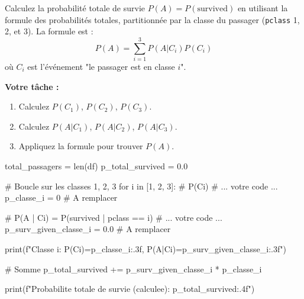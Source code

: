 \begin{exercicebox}
Calculez la probabilité totale de survie $P(A) = P(\text{survived})$ en utilisant la formule des probabilités totales, partitionnée par la classe du passager (\texttt{pclass} 1, 2, et 3).
La formule est :
$$P(A) = \sum_{i=1}^{3} P(A | C_i) P(C_i)$$
où $C_i$ est l'événement "le passager est en classe $i$".

\textbf{Votre tâche :}
\begin{enumerate}
    \item Calculez $P(C_1)$, $P(C_2)$, $P(C_3)$.
    \item Calculez $P(A | C_1)$, $P(A | C_2)$, $P(A | C_3)$.
    \item Appliquez la formule pour trouver $P(A)$.
\end{enumerate}

\begin{codecell}
total_passagers = len(df)
p_total_survived = 0.0

# Boucle sur les classes 1, 2, 3
for i in [1, 2, 3]:
    # P(Ci)
    # ... votre code ...
    p_classe_i = 0 # A remplacer
    
    # P(A | Ci) = P(survived | pclass == i)
    # ... votre code ...
    p_surv_given_classe_i = 0.0 # A remplacer
        
    print(f"Classe {i}: P(C{i})={p_classe_i:.3f}, P(A|C{i})={p_surv_given_classe_i:.3f}")
    
    # Somme
    p_total_survived += p_surv_given_classe_i * p_classe_i

print(f"Probabilite totale de survie (calculee): {p_total_survived:.4f}")
\end{codecell}
\end{exercicebox}



